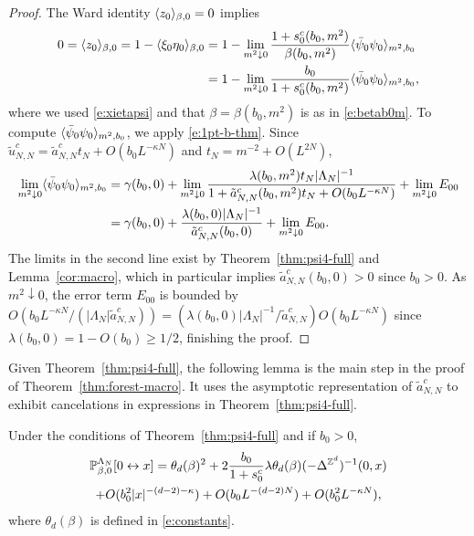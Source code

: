 \documentclass[11pt]{amsart}
\numberwithin{equation}{section}
\numberwithin{theorem}{section}
\newcommand{\conn}{\leftrightarrow}
\newcommand{\1}{{\bf 1}}
\newcommand{\clambda}{\lambda}
\begin{document}
\begin{proof}
  The Ward identity $\langle z_0 \rangle_{\beta,0}=0$ implies
  \begin{align}
    0=\langle z_0 \rangle_{\beta,0}
   = 1-\langle \xi_0\eta_0 \rangle_{\beta,0}
    &=1-\lim_{m^2\downarrow 0} \frac{1+s_0^c(b_0,m^2)}{\beta(b_0,m^2)}\langle \bar\psi_0\psi_0 \rangle_{m^2,b_0}
    \nonumber\\
    & =1-\lim_{m^2\downarrow 0} \frac{b_0}{1+s_0^c(b_0,m^2)}\langle \bar\psi_0\psi_0 \rangle_{m^2,b_0},
  \end{align}
  where we used \eqref{e:xietapsi} and
  that
  $\beta=\beta(b_0,m^2)$ is as in \eqref{e:betab0m}.
  To compute $\langle \bar\psi_0\psi_0 \rangle_{m^2,b_0}$, we apply     \eqref{e:1pt-b-thm}.
  Since $\tilde u_{N,N}^c = \tilde a_{N,N}^ct_N +
  O(b_0L^{-\kappa N})$ and $t_N = m^{-2}+O(L^{2N})$, 
  \begin{align}
       \lim_{m^2\downarrow 0}\langle \bar\psi_0\psi_0 \rangle_{m^2,b_0}
    &= \gamma(b_{0},0) + \lim_{m^{2}\downarrow 0} \frac{\lambda(b_{0},m^{2})
      t_{N}|\Lambda_{N}|^{-1}}{1+\tilde
      a_{N,N}^{c}(b_{0},m^{2})t_{N}+O(b_{0}L^{-\kappa N})} +
      \lim_{m^{2}\downarrow 0}E_{00}
      \nonumber\\
    &= \gamma(b_{0},0) +
      \frac{\lambda(b_{0},0)|\Lambda_{N}|^{-1}}{\tilde
      a_{N,N}^c(b_{0},0)} + \lim_{m^{2}\downarrow 0}E_{00}.
  \end{align}
The limits in the second line exist by
Theorem~\ref{thm:psi4-full} and Lemma~\ref{cor:macro},
which in particular implies $\tilde a_{N,N}^c(b_0,0) > 0$ since $b_0>0$.
As $m^2\downarrow 0$, the error term $E_{00}$ is bounded by
$O(b_0L^{-\kappa N}/(|\Lambda_N|\tilde a_{N,N}^c))
= (\lambda(b_{0},0) |\Lambda_N|^{-1}/\tilde a_{N,N}^c)O(b_0L^{-\kappa N})$
since $\lambda(b_{0},0) =1-O(b_0)\geq 1/2$, finishing the proof.
\end{proof}

Given Theorem~\ref{thm:psi4-full}, the following lemma is the main step in the proof of Theorem~\ref{thm:forest-macro}.
It uses the asymptotic representation of $\tilde a_{N,N}^c$ to exhibit cancelations in
expressions in Theorem~\ref{thm:psi4-full}.

\begin{lemma} \label{cor:conn4pt}
  Under the conditions of
  Theorem~\ref{thm:psi4-full} and if $b_{0}>0$,
  \begin{multline}
  \label{E:tredens}
  \P_{\beta,0}^{\Lambda_N}[0\conn x]
    = \theta_d(\beta)^2
    + 
    2 \frac{b_0}{1+s_0^c}
    \clambda \theta_d(\beta)
    (-\Delta^{\Z^d})^{-1}(0,x)
    \\
    + O(b_0^{2}|x|^{-(d-2)-\kappa}) 
    + O(b_0L^{-(d-2)N})
    + O(b_0^2L^{-\kappa N}),
  \end{multline}
  where $\theta_d(\beta)$ is defined in \eqref{e:constants}.
\end{lemma}
\end{document}
